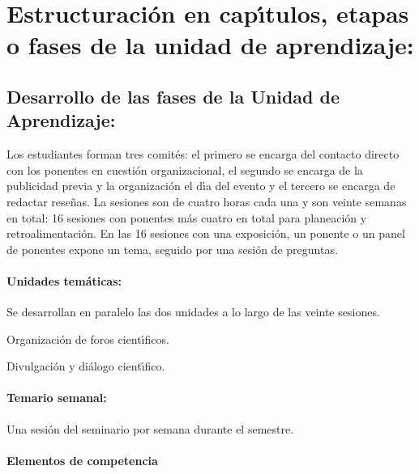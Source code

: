 \section{Estructuraci\'{o}n en cap\'{\i}tulos, etapas o fases de la unidad de
  aprendizaje:}

\subsection{Desarrollo de las fases de la Unidad de Aprendizaje:}

\quad

Los estudiantes forman tres comit\'{e}s: el primero se encarga del
contacto directo con los ponentes en cuesti\'{o}n organizacional, el
segundo se encarga de la publicidad previa y la organizaci\'{o}n el
d\'{\i}a del evento y el tercero se encarga de redactar rese\~{n}as.
La sesiones son de cuatro horas cada una y son veinte semanas en
total: 16 sesiones con ponentes m\'{a}s cuatro en total para
planeaci\'{o}n y retroalimentaci\'{o}n. En las 16 sesiones con una
exposici\'{o}n, un ponente o un panel de ponentes expone un tema,
seguido por una sesi\'{o}n de preguntas.

\paragraph{Unidades tem\'{a}ticas:}

\quad

Se desarrollan en paralelo las dos unidades a lo largo de las veinte
sesiones.

\begin{description}[itemsep=-2pt]
\item[U1]{Organizaci\'{o}n de foros cient\'{\i}ficos.}
\item[U2]{Divulgaci\'{o}n y di\'{a}logo cient\'{\i}fico.}
\end{description}

\paragraph{Temario semanal:}

\quad

Una sesi\'{o}n del seminario por semana durante el semestre.

\newpage

\paragraph{Elementos de competencia}

